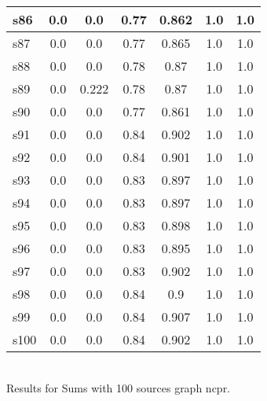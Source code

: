 \documentclass{article}
\begin{document}
\begin{tabular}{|l|c|c|c|c|c|c|}
\hline
s86 &0.0 & 0.0 & 0.77 & 0.862 & 1.0 & 1.0\\
\hline
s87 &0.0 & 0.0 & 0.77 & 0.865 & 1.0 & 1.0\\
\hline
s88 &0.0 & 0.0 & 0.78 & 0.87 & 1.0 & 1.0\\
\hline
s89 &0.0 & 0.222 & 0.78 & 0.87 & 1.0 & 1.0\\
\hline
s90 &0.0 & 0.0 & 0.77 & 0.861 & 1.0 & 1.0\\
\hline
s91 &0.0 & 0.0 & 0.84 & 0.902 & 1.0 & 1.0\\
\hline
s92 &0.0 & 0.0 & 0.84 & 0.901 & 1.0 & 1.0\\
\hline
s93 &0.0 & 0.0 & 0.83 & 0.897 & 1.0 & 1.0\\
\hline
s94 &0.0 & 0.0 & 0.83 & 0.897 & 1.0 & 1.0\\
\hline
s95 &0.0 & 0.0 & 0.83 & 0.898 & 1.0 & 1.0\\
\hline
s96 &0.0 & 0.0 & 0.83 & 0.895 & 1.0 & 1.0\\
\hline
s97 &0.0 & 0.0 & 0.83 & 0.902 & 1.0 & 1.0\\
\hline
s98 &0.0 & 0.0 & 0.84 & 0.9 & 1.0 & 1.0\\
\hline
s99 &0.0 & 0.0 & 0.84 & 0.907 & 1.0 & 1.0\\
\hline
s100 &0.0 & 0.0 & 0.84 & 0.902 & 1.0 & 1.0\\
\hline
\end{tabular}\\

\noindent Results for Sums with 100 sources graph ncpr.
\end{document}
